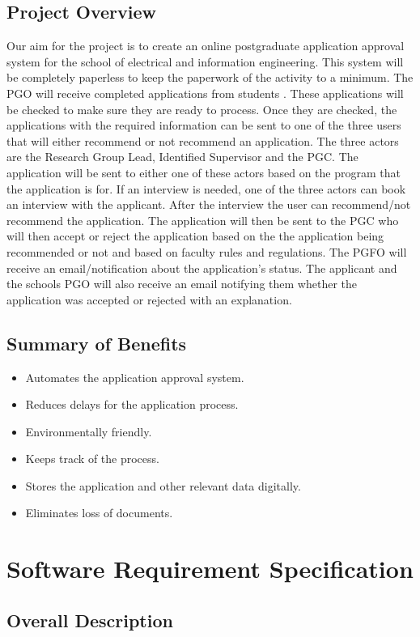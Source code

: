 \documentclass{article}
\begin{document}
\subsection{Project Overview}
Our aim for the project is to create an online postgraduate application approval system for the school of electrical and information engineering. This system will be completely paperless to keep the paperwork of the activity to a minimum.
The PGO will receive completed applications from students .
These applications will be checked to make sure they are ready to process. Once they are checked,
the applications with the required information can be sent to one of the three users that will either
recommend or not recommend an application. The three actors are the Research Group Lead, Identified Supervisor and the PGC. The application will be sent to either one of these actors based on the program
that the application is for. If an interview is needed, one of the three actors can book an interview
with the applicant. After the interview the user can recommend/not recommend the application. The
application will then be sent to the PGC who will then accept or reject the application based on the
the application being recommended or not and based on faculty rules and regulations. The PGFO
will receive an email/notification about the application's status. The applicant and the schools PGO
will also receive an email notifying them whether the application was accepted or rejected with an explanation.
\subsection{Summary of Benefits}
\begin{itemize}
\item Automates the application approval system.
\item Reduces delays for the application process.
\item Environmentally friendly.
\item Keeps track of the process.
\item Stores the application and other relevant data digitally.
\item Eliminates loss of documents.
\end{itemize}
\section{Software Requirement Specification}
\subsection{Overall Description}
\end{document}
